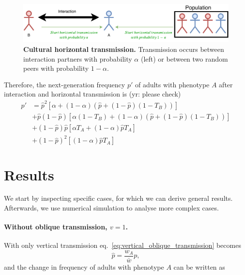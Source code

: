 \documentclass{article}
\begin{document}
\begin{figure}[h!]
  \centering
  \includegraphics[scale=1]{figure.pdf}
  \caption{\textbf{Cultural horizontal transmission.} Transmission occurs between interaction partners with probability $\alpha$ (left) or between two random peers with probability $1-\alpha$.}
  \label{fig:horizontal}
\end{figure}

Therefore, the next-generation frequency $p'$ of adults with phenotype $A$ after interaction and horizontal transmission is (yr: please check)
\begin{equation}\label{eq:horizontal}
\begin{aligned}
p'
& = \hat{p}^2 [\alpha + (1-\alpha)(\hat{p} + (1-\hat{p})(1-T_B))] \\
& + \hat{p}(1-\hat{p}) [\alpha(1-T_B) + (1-\alpha)(\hat{p} + (1-\hat{p})(1-T_B))] \\
& + (1-\hat{p})\hat{p} [\alpha T_A + (1-\alpha) \hat{p} T_A ] \\
& + (1-\hat{p})^2 [(1-\alpha) \hat{p} T_A]
\end{aligned}
\end{equation}

\section*{Results}

We start by inspecting specific cases, for which we can derive general results. 
Afterwards, we use numerical simulation to analyse more complex cases.

\paragraph*{Without oblique transmission, $v=1$.} 
With only vertical transmission eq.~\ref{eq:vertical_oblique_transmission} becomes
\begin{equation}
\hat{p} = \frac{w_A}{\bar{w}} p,
\end{equation}
and the change in frequency of adults with phenotype $A$ can be written as
\end{document}
